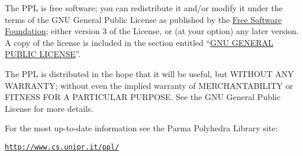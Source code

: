\documentclass[a4paper]{article}
\begin{document}
The PPL is free software; you can redistribute it and/or modify it
under the terms of the GNU General Public License as published by the
\href{http://www.fsf.org}{Free Software Foundation}; either version 3
of the License, or (at your option) any later version.
A copy of the license is included in the section entitled
``\hyperlink{GPL_GPL}{GNU GENERAL PUBLIC LICENSE}''.

The PPL is distributed in the hope that it will be useful, but WITHOUT
ANY WARRANTY; without even the implied warranty of MERCHANTABILITY or
FITNESS FOR A PARTICULAR PURPOSE.  See the GNU General Public License
for more details.

For the most up-to-date information see the Parma Polyhedra Library
site:
\begin{center}
\href{http://www.cs.unipr.it/ppl/}{\tt http://www.cs.unipr.it/ppl/}
\end{center}

\tableofcontents
{}
\end{document}
